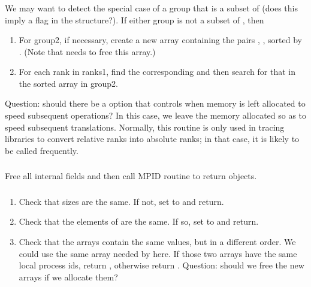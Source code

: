\documentclass{article}
\begin{document}
\subsubsection{}
We may want to detect the special case of a group that is a subset of
 (does this imply a flag in the 
structure?).  
If either group is not a subset of , then 
\begin{enumerate}
\item For group2, if necessary, create a new array containing the pairs
  , , sorted by . (Note that  needs to free this array.)
\item For each rank in ranks1, find the corresponding 
  and then search for that in the sorted array in group2.  
\end{enumerate}
Question: should there be a  option that controls when
memory is left allocated to speed subsequent operations?  In this case, we
leave the memory allocated so as to speed subsequent translations.  Normally,
this routine is only used in tracing libraries to convert relative ranks into
absolute ranks; in that case, it is likely to be called frequently.

\subsubsection{}
Free all internal fields and then call MPID routine to return objects.

\subsubsection{}
\begin{enumerate}
\item Check that sizes are the same.  If not, set  to
   and return.
\item Check that the elements of  are the same.  If so,
set  to  and return.
\item Check that the  arrays contain the same values, but
  in a different order.  We could use the same array needed by
   here.  If those two arrays have the same
  local process ids, return , otherwise return
  .  Question: should we free the new arrays if we
  allocate them?
\end{enumerate}
\end{document}
